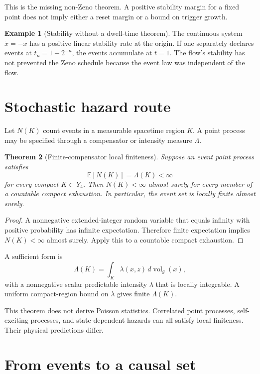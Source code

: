 \documentclass[11pt]{article}
\newtheorem{theorem}{Theorem}[section]
\theoremstyle{definition}
\newtheorem{example}[theorem]{Example}
\theoremstyle{remark}
\newcommand{\vol}{\operatorname{vol}}
\begin{document}
This is the missing non-Zeno theorem. A positive stability margin for a
fixed point does not imply either a reset margin or a bound on trigger
growth.

\begin{example}[Stability without a dwell-time theorem]
The continuous system \(\dot x=-x\) has a positive linear stability rate at
the origin. If one separately declares events at \(t_n=1-2^{-n}\), the
events accumulate at \(t=1\). The flow's stability has not prevented the
Zeno schedule because the event law was independent of the flow.
\end{example}

\section{Stochastic hazard route}

Let \(N(K)\) count events in a measurable spacetime region \(K\). A point
process may be specified through a compensator or intensity measure
\(\Lambda\).

\begin{theorem}[Finite-compensator local finiteness]
\label{thm:compensator}
Suppose an event point process satisfies
\[
 \mathbb E[N(K)]=\Lambda(K)<\infty
\]
for every compact \(K\subset Y_4\). Then \(N(K)<\infty\) almost surely for
every member of a countable compact exhaustion. In particular, the event set
is locally finite almost surely.
\end{theorem}

\begin{proof}
A nonnegative extended-integer random variable that equals infinity with
positive probability has infinite expectation. Therefore finite expectation
implies \(N(K)<\infty\) almost surely. Apply this to a countable compact
exhaustion.
\end{proof}

A sufficient form is
\[
 \Lambda(K)=\int_K\lambda(x,z)\,d\vol_g(x),
\]
with a nonnegative scalar predictable intensity \(\lambda\) that is locally
integrable. A uniform compact-region bound on \(\lambda\) gives finite
\(\Lambda(K)\).

This theorem does not derive Poisson statistics. Correlated point processes,
self-exciting processes, and state-dependent hazards can all satisfy local
finiteness. Their physical predictions differ.

\section{From events to a causal set}
\end{document}
